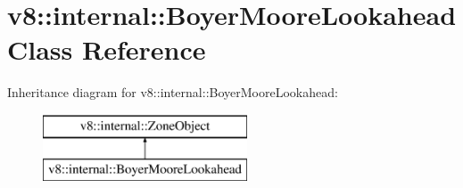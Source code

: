 \hypertarget{classv8_1_1internal_1_1_boyer_moore_lookahead}{}\section{v8\+:\+:internal\+:\+:Boyer\+Moore\+Lookahead Class Reference}
\label{classv8_1_1internal_1_1_boyer_moore_lookahead}
Inheritance diagram for v8\+:\+:internal\+:\+:Boyer\+Moore\+Lookahead\+:\begin{figure}[H]
\begin{center}
\leavevmode
\includegraphics[height=2.000000cm]{classv8_1_1internal_1_1_boyer_moore_lookahead}
\end{center}
\end{figure}
